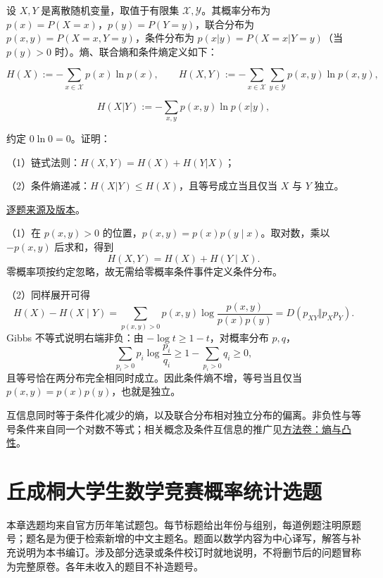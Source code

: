 \documentclass[UTF8,12pt,a4paper,fontset=fandol]{ctexbook}
\begin{document}
\begin{example}[公开题解转录]\label{q:fin17-high:12}

设 $X,Y$ 是离散随机变量，取值于有限集 $\mathcal X,\mathcal Y$。其概率分布为 $p(x)=P(X=x)$，$p(y)=P(Y=y)$，联合分布为 $p(x,y)=P(X=x,Y=y)$，条件分布为 $p(x|y)=P(X=x|Y=y)$（当 $p(y)>0$ 时）。熵、联合熵和条件熵定义如下：

\[
H(X):=-\sum_{x\in\mathcal X}p(x)\ln p(x),\qquad
H(X,Y):=-\sum_{x\in\mathcal X}\sum_{y\in\mathcal Y}p(x,y)\ln p(x,y),
\]

\[
H(X|Y):=-\sum_{x,y}p(x,y)\ln p(x|y),
\]

约定 $0\ln0=0$。证明：

（1）链式法则：$H(X,Y)=H(X)+H(Y|X)$；

（2）条件熵递减：$H(X|Y)\le H(X)$，且等号成立当且仅当 $X$ 与 $Y$ 独立。

\end{example}

\href{https://github.com/lzxcr/cmc-mathematics/blob/64916fa1fdbc3e444a652eca204d5669058ee321/src/problems/finals/17/15.md}{逐题来源及版本}。

\begin{solve}

（1）在 $p(x,y)>0$ 的位置，$p(x,y)=p(x)p(y\mid x)$。取对数，乘以 $-p(x,y)$ 后求和，得到
\[
H(X,Y)=H(X)+H(Y\mid X).
\]
零概率项按约定忽略，故无需给零概率条件事件定义条件分布。

（2）同样展开可得
\[
H(X)-H(X\mid Y)
=\sum_{p(x,y)>0}p(x,y)\log\frac{p(x,y)}{p(x)p(y)}
=D(p_{XY}\Vert p_Xp_Y).
\]
Gibbs 不等式说明右端非负：由 $-\log t\ge1-t$，对概率分布 $p,q$，
\[
\sum_{p_i>0}p_i\log\frac{p_i}{q_i}
\ge1-\sum_{p_i>0}q_i\ge0,
\]
且等号恰在两分布完全相同时成立。因此条件熵不增，等号当且仅当 $p(x,y)=p(x)p(y)$，也就是独立。

\end{solve}

\begin{remark}[方法与条件]

互信息同时等于条件化减少的熵，以及联合分布相对独立分布的偏离。非负性与等号条件来自同一个对数不等式；相关概念及条件互信息的推广见\hyperref[app:probability-entropy]{方法卷：熵与凸性}。

\end{remark}

\chapter{丘成桐大学生数学竞赛概率统计选题}
本章选题均来自官方历年笔试题包。每节标题给出年份与组别，每道例题注明原题号；题名是为便于检索新增的中文主题名。题面以数学内容为中心译写，解答与补充说明为本书编订。涉及部分选录或条件校订时就地说明，不将删节后的问题冒称为完整原卷。各年未收入的题目不补造题号。
\end{document}
